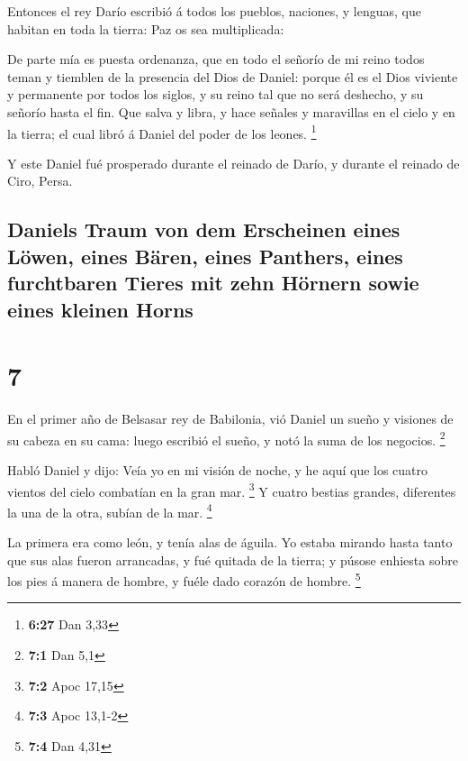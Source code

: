  Entonces el rey Darío escribió á todos los pueblos,
naciones, y lenguas, que habitan en toda la tierra: Paz os sea
multiplicada:

 De parte mía es puesta ordenanza, que en todo el señorío
de mi reino todos teman y tiemblen de la presencia del Dios de Daniel:
porque él es el Dios viviente y permanente por todos los siglos, y su
reino tal que no será deshecho, y su señorío hasta el fin. 
Que salva y libra, y hace señales y maravillas en el cielo y en la
tierra; el cual libró á Daniel del poder de los leones. \footnote{\textbf{6:27}
  Dan 3,33}

 Y este Daniel fué prosperado durante el reinado de Darío,
y durante el reinado de Ciro, Persa.

\hypertarget{daniels-traum-von-dem-erscheinen-eines-luxf6wen-eines-buxe4ren-eines-panthers-eines-furchtbaren-tieres-mit-zehn-huxf6rnern-sowie-eines-kleinen-horns}{%
\subsection{Daniels Traum von dem Erscheinen eines Löwen, eines Bären,
eines Panthers, eines furchtbaren Tieres mit zehn Hörnern sowie eines
kleinen
Horns}\label{daniels-traum-von-dem-erscheinen-eines-luxf6wen-eines-buxe4ren-eines-panthers-eines-furchtbaren-tieres-mit-zehn-huxf6rnern-sowie-eines-kleinen-horns}}

\hypertarget{section-6}{%
\section{7}\label{section-6}}

 En el primer año de Belsasar rey de Babilonia, vió Daniel
un sueño y visiones de su cabeza en su cama: luego escribió el sueño, y
notó la suma de los negocios. \footnote{\textbf{7:1} Dan 5,1}

 Habló Daniel y dijo: Veía yo en mi visión de noche, y he
aquí que los cuatro vientos del cielo combatían en la gran mar.
\footnote{\textbf{7:2} Apoc 17,15}  Y cuatro bestias
grandes, diferentes la una de la otra, subían de la mar. \footnote{\textbf{7:3}
  Apoc 13,1-2}

 La primera era como león, y tenía alas de águila. Yo estaba
mirando hasta tanto que sus alas fueron arrancadas, y fué quitada de la
tierra; y púsose enhiesta sobre los pies á manera de hombre, y fuéle
dado corazón de hombre. \footnote{\textbf{7:4} Dan 4,31}

